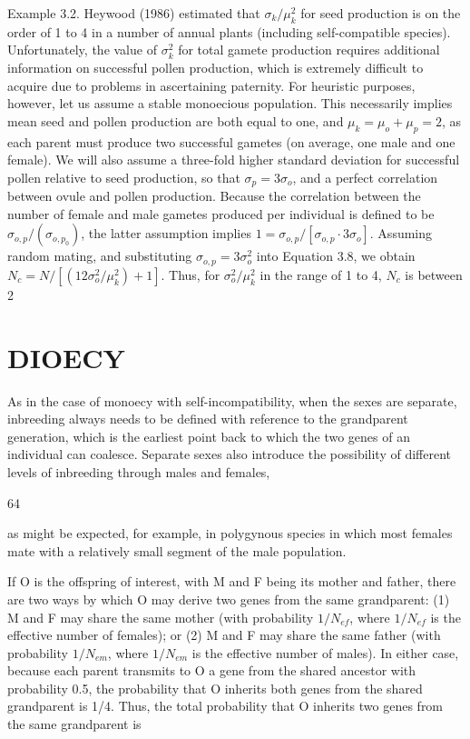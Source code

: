 \documentclass{article}
\begin{document}
Example 3.2. Heywood (1986) estimated that  $ \sigma_k / \mu_k^2 $ for seed production is on the order of 1 to 4 in a number of annual plants (including self-compatible species). Unfortunately, the value of  $ \sigma_k^2 $ for total gamete production requires additional information on successful pollen production, which is extremely difficult to acquire due to problems in ascertaining paternity. For heuristic purposes, however, let us assume a stable monoecious population. This necessarily implies mean seed and pollen production are both equal to one, and  $ \mu_k = \mu_o + \mu_p = 2 $, as each parent must produce two successful gametes (on average, one male and one female). We will also assume a three-fold higher standard deviation for successful pollen relative to seed production, so that  $ \sigma_p = 3\sigma_o $, and a perfect correlation between ovule and pollen production. Because the correlation between the number of female and male gametes produced per individual is defined to be  $ \sigma_{o,p} / (\sigma_{o,p_0}) $, the latter assumption implies  $ 1 = \sigma_{o,p} / [\sigma_{o,p} \cdot 3\sigma_{o}] $. Assuming random mating, and substituting  $ \sigma_{o,p} = 3\sigma_o^2 $ into Equation 3.8, we obtain  $ N_c = N / [(12\sigma_o^2 / \mu_k^2) + 1] $. Thus, for  $ \sigma_o^2 / \mu_k^2 $ in the range of 1 to 4,  $ N_c $ is between 2%

\section{DIOECY}
As in the case of monoecy with self-incompatibility, when the sexes are separate, inbreeding always needs to be defined with reference to the grandparent generation, which is the earliest point back to which the two genes of an individual can coalesce. Separate sexes also introduce the possibility of different levels of inbreeding through males and females,

64

as might be expected, for example, in polygynous species in which most females mate with a relatively small segment of the male population.

If O is the offspring of interest, with M and F being its mother and father, there are two ways by which O may derive two genes from the same grandparent: (1) M and F may share the same mother (with probability  $ 1/N_{ef} $, where  $ 1/N_{ef} $ is the effective number of females); or (2) M and F may share the same father (with probability  $ 1/N_{em} $, where  $ 1/N_{em} $ is the effective number of males). In either case, because each parent transmits to O a gene from the shared ancestor with probability 0.5, the probability that O inherits both genes from the shared grandparent is 1/4. Thus, the total probability that O inherits two genes from the same grandparent is
\end{document}
